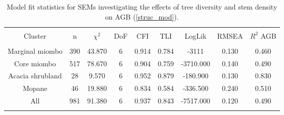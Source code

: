 
\begin{table}[!htbp] \centering 
  \caption{Model fit statistics for SEMs investigating the effects of tree diversity and stem density on AGB (\autoref{struc_mod}).} 
  \label{struc_model_fit_clust_stats} 
\begin{tabular}{@{\extracolsep{0pt}} ccccccccc} 
\\[-1.8ex]\hline 
\hline \\[-1.8ex] 
{Cluster} & {n} & {$\chi^{2}$} & {DoF} & {CFI} & {TLI} & {LogLik} & {RMSEA} & {$R^{2}$ AGB} \\
\hline \\[-1.8ex] 
Marginal miombo & 390 & 43.870 & 6 & 0.914 & 0.784 & -3111 & 0.130 & 0.460 \\ 
Core miombo & 517 & 78.670 & 6 & 0.904 & 0.759 & -3710.000 & 0.140 & 0.490 \\ 
Acacia shrubland & 28 & 9.570 & 6 & 0.952 & 0.879 & -180.900 & 0.130 & 0.830 \\ 
Mopane & 46 & 19.880 & 6 & 0.834 & 0.584 & -336.500 & 0.240 & 0.510 \\ 
All & 981 & 91.380 & 6 & 0.937 & 0.843 & -7517.000 & 0.120 & 0.490 \\ 
\hline \\[-1.8ex] 
\end{tabular} 
\end{table} 
